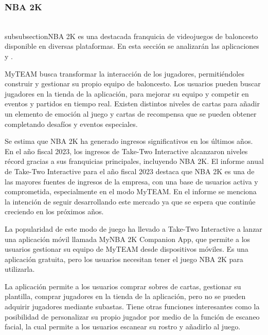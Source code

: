 \subsubsection{NBA 2K}
\\subsubsection{NBA 2K}
 es una destacada franquicia de videojuegos de baloncesto disponible en diversas plataformas. 
En esta sección se analizarán las aplicaciones  y .

MyTEAM busca transformar la interacción de los jugadores, permitiéndoles construir y gestionar su propio equipo de baloncesto. Los usuarios pueden buscar jugadores en la tienda de la aplicación, para mejorar su equipo y competir en eventos y partidos en tiempo real.
Existen distintos niveles de cartas para añadir un elemento de emoción al juego y cartas de recompensa que se pueden obtener completando desafíos y eventos especiales.

Se estima que NBA 2K ha generado ingresos significativos en los últimos años. En el año fiscal 2023, 
los ingresos de Take-Two Interactive alcanzaron niveles récord gracias a sus franquicias principales, incluyendo NBA 2K. El informe anual de Take-Two Interactive para el año fiscal 2023\cite{take_two_2023} 
destaca que NBA 2K es una de las mayores fuentes de ingresos de la empresa, con una base de usuarios activa y comprometida, especialmente en el modo MyTEAM. 
En el informe se menciona la intención de seguir desarrollando este mercado ya que se espera que continúe creciendo en los próximos años.

La popularidad de este modo de juego ha llevado a Take-Two Interactive a lanzar una aplicación móvil llamada MyNBA 2K Companion App, 
que permite a los usuarios gestionar su equipo de MyTEAM desde dispositivos móviles. Es una aplicación gratuita, pero los usuarios necesitan tener el juego NBA 2K para utilizarla.

La aplicación permite a los usuarios comprar sobres de cartas, gestionar su plantilla, comprar jugadores en la tienda de la aplicación, pero no se pueden adquirir jugadores mediante subastas.
Tiene otras funciones interesantes como la posibilidad de personalizar su propio jugador por medio de la función de escaneo facial, la cual permite a los usuarios escanear su rostro y añadirlo al juego.

